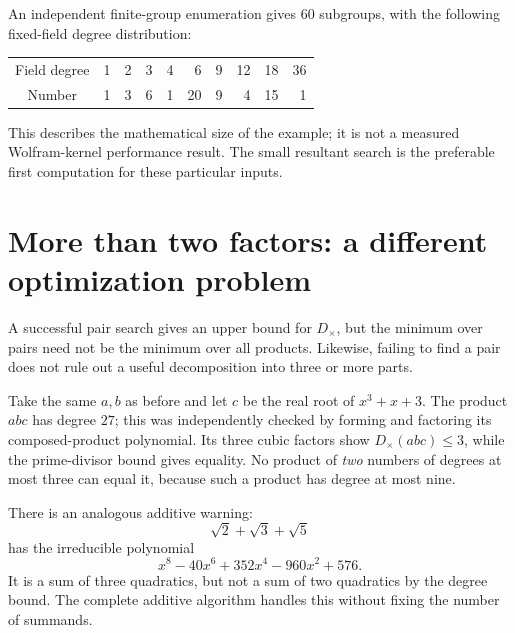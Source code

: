 \documentclass[11pt,a4paper]{article}
\theoremstyle{definition}\newtheorem{definition}[theorem]{Definition}
\theoremstyle{remark}\newtheorem{remark}[theorem]{Remark}
\begin{document}
An independent finite-group enumeration gives $60$ subgroups, with the following fixed-field degree distribution:
\begin{center}
\begin{tabular}{c*{9}{r}}
\toprule
Field degree &1&2&3&4&6&9&12&18&36\\
Number &1&3&6&1&20&9&4&15&1\\
\bottomrule
\end{tabular}
\end{center}
This describes the mathematical size of the example; it is not a measured Wolfram-kernel performance result. The small resultant search is the preferable first computation for these particular inputs.

\section{More than two factors: a different optimization problem}
\label{sec:many}
A successful pair search gives an upper bound for $D_{\times}$, but the minimum over pairs need not be the minimum over all products. Likewise, failing to find a pair does not rule out a useful decomposition into three or more parts.

Take the same $a,b$ as before and let $c$ be the real root of $x^3+x+3$. The product $abc$ has degree $27$; this was independently checked by forming and factoring its composed-product polynomial. Its three cubic factors show $D_{\times}(abc)\leq3$, while the prime-divisor bound gives equality. No product of \emph{two} numbers of degrees at most three can equal it, because such a product has degree at most nine.

There is an analogous additive warning:
\[
\sqrt2+\sqrt3+\sqrt5
\]
has the irreducible polynomial
\[
x^8-40x^6+352x^4-960x^2+576.
\]
It is a sum of three quadratics, but not a sum of two quadratics by the degree bound. The complete additive algorithm handles this without fixing the number of summands.
\end{document}
